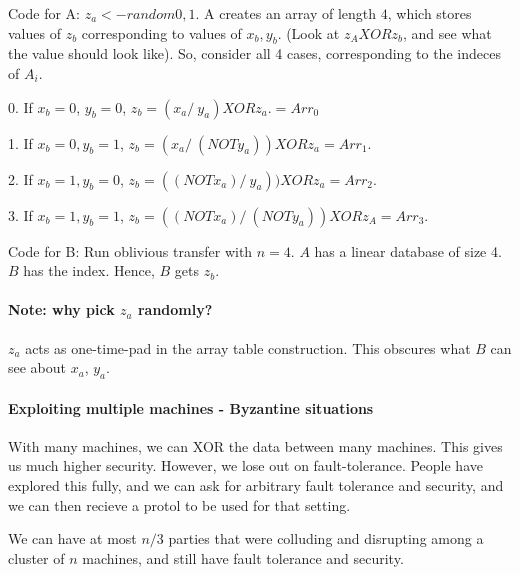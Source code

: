 Code for A:
$z_a <- random {0, 1}$. 
A creates an array of length $4$, which stores values of $z_b$ corresponding to values of $x_b, y_b$.
(Look at $z_A XOR z_b$, and see what the value should look like). So, consider all 4 cases, corresponding
to the indeces of $A_i$.

0. If $x_b = 0$, $y_b = 0$,
$z_b = (x_a /\ y_a) XOR z_a. = Arr_0$


1. If $x_b = 0, y_b = 1$,
$z_b = (x_a /\ (NOT y_a)) XOR z_a = Arr_1.$


2. If $x_b = 1, y_b = 0$,
$z_b = ((NOT x_a) /\ y_a)) XOR z_a = Arr_2$.


3. If $x_b = 1, y_b = 1$,
$z_b = ((NOT x_a) /\ (NOT y_a)) XOR z_A = Arr_3$.


Code for B:
Run oblivious transfer with $n = 4$. $A$ has a linear database of size 4. $B$ has the index.
Hence, $B$ gets $z_b$.


\paragraph{Note: why pick $z_a$ randomly?}
$z_a$ acts as one-time-pad in the array table construction. This obscures
what $B$ can see about $x_a$, $y_a$.

\paragraph{Exploiting multiple machines - Byzantine situations}

With many machines, we can XOR the data between many machines. This gives us much higher security.
However, we lose out on fault-tolerance. People have explored this fully, and we can ask for arbitrary fault tolerance and security,
and we can then recieve a protol to be used for that setting.

We can have at most $n/3$ parties that were colluding and disrupting among a cluster of $n$ machines, and still have
fault tolerance and security.

